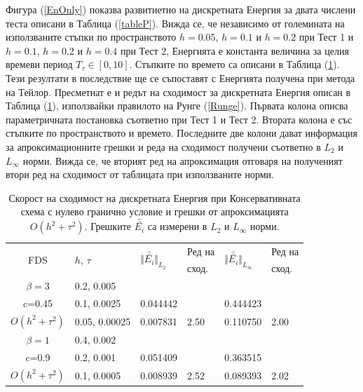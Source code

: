 \documentclass{article}
\newcommand{\rf}[1]{(\ref{#1})}
\begin{document}
Фигура \rf{EnOnly} показва развитиетно на дискретната Енергия за двата числени теста описани в Таблица \rf{tableP}. Вижда се, че независимо от големината на използваните стъпки по пространството $h = 0.05$, $h = 0.1$ и $h = 0.2$ при Тест 1 и $h = 0.1$, $h = 0.2$ и $h = 0.4$ при Тест 2, Енергията е константа величина за целия времеви период $T_{\tau} \in [0, 10]$. Стъпките по времето са описани в Таблица \rf{tableD}. Тези резултати в последствие ще се съпоставят с Енергията получена при метода на Тейлор. Пресметнат е и редът на сходимост за дискретната Енергия описан в Таблица \rf{tableD}, използвайки правилото на Рунге \rf{Runge}. Първата колона описва параметричната постановка съответно при Тест 1 и Тест 2. Втората колона е със стъпките по пространството и времето. Последните две колони дават информация за апроксимационните грешки и реда на сходимост получени съответно в $L_2$ и $L_\infty$ норми. Вижда се, че вторият ред на апроксимация отговаря на полученият втори ред на сходимост от таблицата при използваните норми.
\begin{table}[ht]
\centering
\small
		\begin{tabular}{||c|l|ll|ll||}
			\hline
			\hline
      \multirow{2  }{*}{FDS}        & \multirow{2  }{*}{$h$, $\tau$}  &  	\multirow{2  }{*}{ $\Vert \bar{\bar{ E_i}} \Vert_{L_2}$ }	&Ред на	& \multirow{2  }{*}{ $\Vert \bar{\bar{ E_i}} \Vert_{L_\infty}$ } 		&Ред на   \\
	                                        &                                                & 							 					&  сход. 	& 								       					& сход. \\
   			\hline 
					\hline 
  $\beta=3$                &0.2, 0.005         &                    &                &                  &                   \\
   c=0.45                     &0.1, 0.0025         & 0.044442   &                & 0.444423  &                   \\
     $O(h^2 + \tau^ 2)$ &0.05, 0.00025  & 0.007831   & 2.50       & 0.110750  & 2.00   \\
	   \hline
			\hline 
       $\beta=1$           & 0.4, 0.002       &                   &           &                 &   \\
                  c=0.9       & 0.2, 0.001        & 0.051409   &          &0.363515  &   \\
  $O(h^2+ \tau^2)$  & 0.1, 0.0005       & 0.008939   & 2.52  &0.089393  & 2.02  \\
	   \hline
			\hline 
		\end{tabular}
		\caption{Скорост на сходимост на дискретната Енергия при Консервативната схема с нулево гранично условие и грешки от апроксимацията $O(h^{2} + \tau^2 )$. Грешките $\bar{\bar{ E_i}}$ са измерени в $L_2$ и $L_\infty$ норми.}
\label{tableD}
\end{table}
\end{document}
